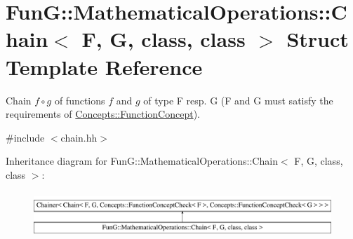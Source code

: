 \hypertarget{structFunG_1_1MathematicalOperations_1_1Chain}{}\section{FunG\+:\+:Mathematical\+Operations\+:\+:Chain$<$ F, G, class, class $>$ Struct Template Reference}
\label{structFunG_1_1MathematicalOperations_1_1Chain}


Chain $ f\circ g $ of functions $f$ and $g$ of type F resp. G (F and G must satisfy the requirements of \hyperlink{structFunG_1_1Concepts_1_1FunctionConcept}{Concepts\+::\+Function\+Concept}).  




{\ttfamily \#include $<$chain.\+hh$>$}

Inheritance diagram for FunG\+:\+:Mathematical\+Operations\+:\+:Chain$<$ F, G, class, class $>$\+:\begin{figure}[H]
\begin{center}
\leavevmode
\includegraphics[height=1.758242cm]{structFunG_1_1MathematicalOperations_1_1Chain}
\end{center}
\end{figure}
